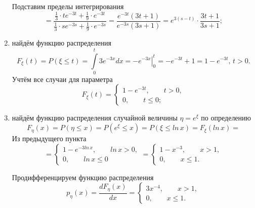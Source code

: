 \begin{enumerate}[label=\alph*)]
\begin{equation*}
  \end{equation*}
  Подставим пределы интегрирования
  \begin{equation*}
    = \frac{ \frac{1}{3} \cdot te^{-3t} + \frac{1}{9} \cdot e^{-3t}}{ \frac{1}{3} \cdot se^{-3s} + \frac{1}{9} \cdot e^{-3s}} =
    \frac{e^{-3t} \left(3t + 1 \right) }{e^{-3s} \left( 3s + 1 \right) } =
    e^{3 \left( s - t \right) } \cdot \frac{3t + 1}{3s + 1};
  \end{equation*}
  \item найдём функцию распределения
  \begin{equation*}
    F_{ \xi } \left( t \right) =
    P \left( \xi \leq t \right) =
    \int \limits_0^t 3e^{-3x} dx =
    \left. -e^{-3x} \right|_0^t =
    -e^{-3t} + 1 =
    1 - e^{-3t}, \,
    t > 0.
  \end{equation*}
  Учтём все случаи для параметра
  \begin{equation*}
    F_{ \xi } \left( t \right) =
    \begin{cases}
      1 - e^{-3t}, \qquad t > 0, \\
      0, \qquad t \leq 0;
    \end{cases}
  \end{equation*}
  \item найдём функцию распределения случайной величины $ \eta = e^{ \xi }$
  по определению
  \begin{equation*}
    F_{ \eta } \left( x \right) =
    P \left( \eta \leq x \right) =
    P \left( e^{ \xi } \leq x \right) =
    P \left( \xi \leq ln \, x \right) =
    F_{ \xi } \left( ln \, x \right) =
  \end{equation*}
  Из предыдущего пункта
  \begin{equation*}
    = \begin{cases}
      1 - e^{-3 ln \, x}, \qquad ln \, x > 0, \\
      0, \qquad ln \, x \leq 0
    \end{cases} =
    \begin{cases}
      1 - x^{-3}, \qquad x > 1, \\
      0, \qquad x \leq 1.
    \end{cases}
  \end{equation*}

  Продифференцируем функцию распределения
  \begin{equation*}
    p_{ \eta } \left( x \right) =
    \frac{dF_{ \eta } \left( x \right) }{dx} =
    \begin{cases}
      3x^{-4}, \qquad x > 1, \\
      0, \qquad x \leq 1.
    \end{cases}
  \end{equation*}
\end{enumerate}
